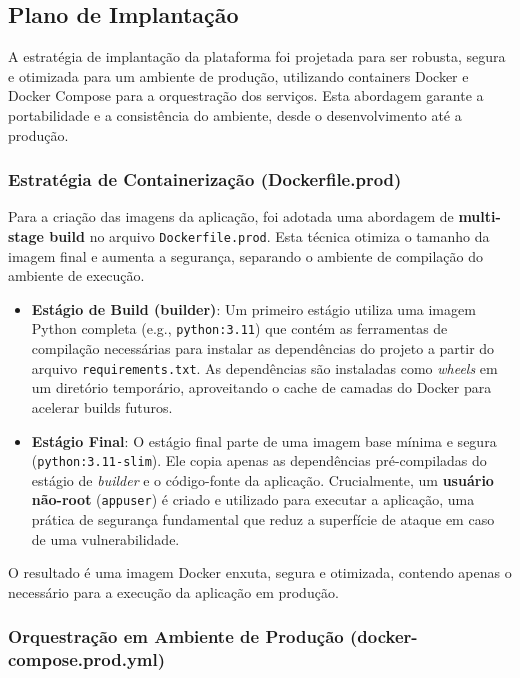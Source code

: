 \subsection{Plano de Implantação}
\label{sec:plano_implantacao}

A estratégia de implantação da plataforma foi projetada para ser robusta, segura e otimizada para um ambiente de produção, utilizando containers Docker e Docker Compose para a orquestração dos serviços. Esta abordagem garante a portabilidade e a consistência do ambiente, desde o desenvolvimento até a produção.

\subsubsection{Estratégia de Containerização (Dockerfile.prod)}

Para a criação das imagens da aplicação, foi adotada uma abordagem de \textbf{multi-stage build} no arquivo \texttt{Dockerfile.prod}. Esta técnica otimiza o tamanho da imagem final e aumenta a segurança, separando o ambiente de compilação do ambiente de execução.

\begin{itemize}
    \item \textbf{Estágio de Build (builder)}: Um primeiro estágio utiliza uma imagem Python completa (e.g., \texttt{python:3.11}) que contém as ferramentas de compilação necessárias para instalar as dependências do projeto a partir do arquivo \texttt{requirements.txt}. As dependências são instaladas como \textit{wheels} em um diretório temporário, aproveitando o cache de camadas do Docker para acelerar builds futuros.
    
    \item \textbf{Estágio Final}: O estágio final parte de uma imagem base mínima e segura (\texttt{python:3.11-slim}). Ele copia apenas as dependências pré-compiladas do estágio de \textit{builder} e o código-fonte da aplicação. Crucialmente, um \textbf{usuário não-root} (\texttt{appuser}) é criado e utilizado para executar a aplicação, uma prática de segurança fundamental que reduz a superfície de ataque em caso de uma vulnerabilidade.
\end{itemize}

O resultado é uma imagem Docker enxuta, segura e otimizada, contendo apenas o necessário para a execução da aplicação em produção.

\subsubsection{Orquestração em Ambiente de Produção (docker-compose.prod.yml)}

